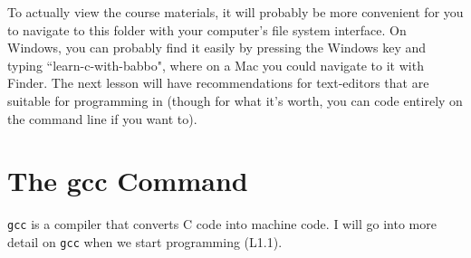 \documentclass{article}
\begin{document}
To actually view the course materials, it will probably be more convenient for you to navigate to this folder with
your computer's file system interface. On Windows, you can probably find it easily by pressing the Windows key and
typing ``learn-c-with-babbo", where on a Mac you could navigate to it with Finder. The next lesson will have
recommendations for text-editors that are suitable for programming in (though for what it's worth, you can code entirely
on the command line if you want to).

\section*{The gcc Command}
\verb|gcc| is a compiler that converts C code into machine code. I will go into more detail on \verb|gcc| when
we start programming (L1.1).
\end{document}
